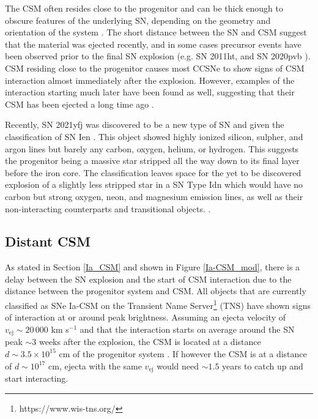 \documentclass[a4paper,oneside,12pt, class=Latex/Classes/PhDthesisPSnPDF, crop=false]{standalone}
\begin{document}
The CSM often resides close to the progenitor and can be thick enough to obscure features of the underlying SN, depending on the geometry and orientation of the system \citep{1994W, PTF11iqb}. The short distance between the SN and CSM suggest that the material was ejected recently, and in some cases precursor events have been observed prior to the final SN explosion (e.g. SN 2011ht, \citealt{2011ht} and SN 2020pvb \citealt{2020pvb}). CSM residing close to the progenitor causes most CCSNe to show signs of CSM interaction almost immediately after the explosion. However, examples of the interaction starting much later have been found as well, suggesting that their CSM has been ejected a long time ago \citep{2008iy, late-CSM_IIn_Spitzer}.

Recently, SN 2021yfj was discovered to be a new type of SN and given the classification of SN Ien \citep{Ien_class}. This object showed highly ionized silicon, sulpher, and argon lines but barely any carbon, oxygen, helium, or hydrogen. This suggests the progenitor being a massive star stripped all the way down to its final layer before the iron core. The classification leaves space for the yet to be discovered explosion of a slightly less stripped star in a SN Type Idn which would have no carbon but strong oxygen, neon, and magnesium emission lines, as well as their non-interacting counterparts and transitional objects. \citep{Ien_disc}.


\subsection{Distant CSM}
As stated in Section \ref{Ia_CSM} and shown in Figure \ref{Ia-CSM_mod}, there is a delay between the SN explosion and the start of CSM interaction due to the distance between the progenitor system and CSM. All objects that are currently classified as SNe Ia-CSM on the Transient Name Server\footnote{https://www.wis-tns.org/} (TNS) have shown signs of interaction at or around peak brightness. Assuming an ejecta velocity of $v_\text{ej} \sim 20\,000$ km s$^{-1}$ and that the interaction starts on average around the SN peak $\sim3$ weeks after the explosion, the CSM is located at a distance $d\sim3.5\times10^{15}$ cm of the progenitor system \citep{Ia-CSM_BTS}. If however the CSM is at a distance of $d\sim10^{17}$ cm, ejecta with the same $v_\text{ej}$ would need $\sim1.5$ years to catch up and start interacting.
\end{document}
